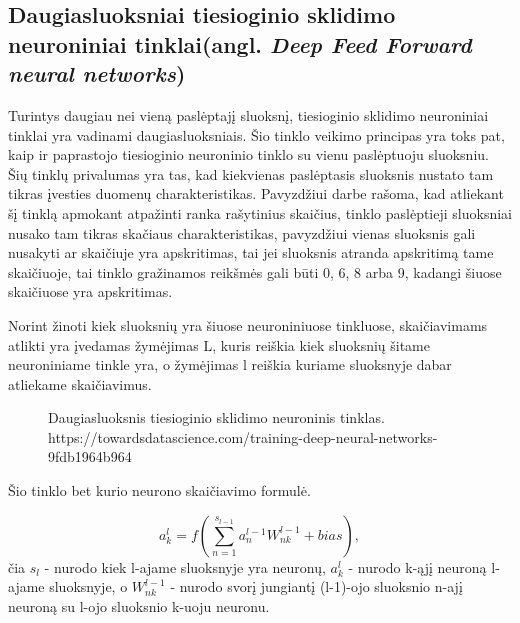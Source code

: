 \subsection{Daugiasluoksniai tiesioginio sklidimo neuroniniai tinklai(angl. \textit{Deep Feed Forward neural networks})}

Turintys daugiau nei vieną paslėptajį sluoksnį, tiesioginio sklidimo neuroniniai tinklai yra vadinami daugiasluoksniais. Šio tinklo veikimo principas yra toks pat, kaip ir paprastojo tiesioginio neuroninio tinklo su vienu paslėptuoju sluoksniu. Šių tinklų privalumas yra tas, kad kiekvienas paslėptasis sluoksnis nustato tam tikras įvesties duomenų charakteristikas. Pavyzdžiui \cite{Deividas2018} darbe rašoma, kad atliekant šį tinklą apmokant atpažinti ranka rašytinius skaičius, tinklo paslėptieji sluoksniai nusako tam tikras skačiaus charakteristikas, pavyzdžiui vienas sluoksnis gali nusakyti ar skaičiuje yra apskritimas, tai jei sluoksnis atranda apskritimą tame skaičiuoje, tai tinklo gražinamos reikšmės gali būti 0, 6, 8 arba 9, kadangi šiuose skaičiuose yra apskritimas.

Norint žinoti kiek sluoksnių yra šiuose neuroniniuose tinkluose, skaičiavimams atlikti yra įvedamas žymėjimas L, kuris reiškia kiek sluoksnių šitame neuroniniame tinkle yra, o žymėjimas l reiškia kuriame sluoksnyje dabar atliekame skaičiavimus.

\begin{figure}[h!]
  \centering
{}
\caption{Daugiasluoksnis tiesioginio sklidimo neuroninis tinklas.\\https://towardsdatascience.com/training-deep-neural-networks-9fdb1964b964}
\label{fig:deepnn}
\end{figure}

Šio tinklo bet kurio neurono skaičiavimo formulė.

\begin{equation*}
  a_k^l = f(\sum_{n=1}^{s_{l-1}} a_n^{l-1}W_{nk}^{l-1} + bias),
\end{equation*}
čia $s_l$ - nurodo kiek l-ajame sluoksnyje yra neuronų, $a_k^l$ - nurodo k-ąjį neuroną l-ajame sluoksnyje, o $W_{nk}^{l-1}$ - nurodo svorį jungiantį (l-1)-ojo sluoksnio n-ajį neuroną su l-ojo sluoksnio k-uoju neuronu.

